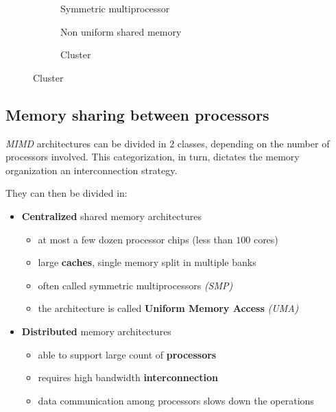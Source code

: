 \documentclass[english]{article}
\begin{document}
\begin{figure}[htbp]
  \begin{subfigure}[b]{0.33\textwidth}
    \bigskip
    \centering
    \caption{Symmetric multiprocessor}
    \label{subfig:symmetric-multiprocessor}
    \bigskip
  \end{subfigure}
  \begin{subfigure}[b]{0.33\textwidth}
    \bigskip
    \centering
    \caption{Non uniform shared memory}
    \label{subfig:non-uniform-shared-memory}
    \bigskip
  \end{subfigure}
  \begin{subfigure}[b]{0.33\textwidth}
    \bigskip
    \centering
    \caption{Cluster}
    \label{subfig:cluster}
    \bigskip
  \end{subfigure}
\end{figure}

\subsection{Memory sharing between processors}

\textit{MIMD} architectures can be divided in \(2\) classes, depending on the number of processors involved.
This categorization, in turn, dictates the memory organization an interconnection strategy.

They can then be divided in:

\begin{itemize}
  \item \textbf{Centralized} shared memory architectures
        \begin{itemize}
          \item at most a few dozen processor chips (less than \(100\) cores)
          \item large \textbf{caches}, single memory split in multiple banks
          \item often called symmetric multiprocessors \textit{(SMP)}
          \item the architecture is called \textbf{Uniform Memory Access} \textit{(UMA)}
        \end{itemize}
  \item \textbf{Distributed} memory architectures
        \begin{itemize}
          \item able to support large count of \textbf{processors}
          \item requires high bandwidth \textbf{interconnection}
          \item data communication among processors slows down the operations
        \end{itemize}
\end{itemize}
\end{document}
